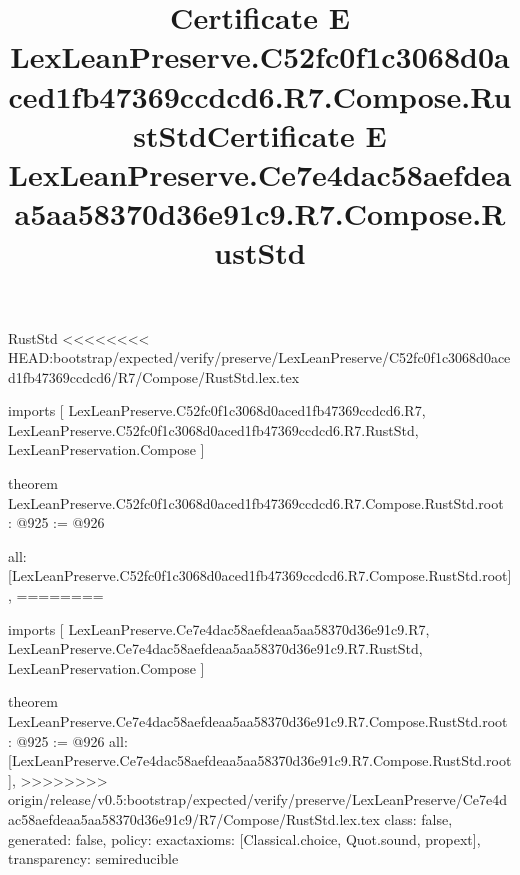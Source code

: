 \begin{lexlean}{RustStd}
<<<<<<<< HEAD:bootstrap/expected/verify/preserve/LexLeanPreserve/C52fc0f1c3068d0aced1fb47369ccdcd6/R7/Compose/RustStd.lex.tex
\title{Certificate E LexLeanPreserve.C52fc0f1c3068d0aced1fb47369ccdcd6.R7.Compose.RustStd}
\begin{coremodule}
imports [
  LexLeanPreserve.C52fc0f1c3068d0aced1fb47369ccdcd6.R7,
  LexLeanPreserve.C52fc0f1c3068d0aced1fb47369ccdcd6.R7.RustStd,
  LexLeanPreservation.Compose
]

theorem LexLeanPreserve.C52fc0f1c3068d0aced1fb47369ccdcd6.R7.Compose.RustStd.root : @925 := @926 {
  all: [LexLeanPreserve.C52fc0f1c3068d0aced1fb47369ccdcd6.R7.Compose.RustStd.root],
========
\title{Certificate E LexLeanPreserve.Ce7e4dac58aefdeaa5aa58370d36e91c9.R7.Compose.RustStd}
\begin{coremodule}
imports [
  LexLeanPreserve.Ce7e4dac58aefdeaa5aa58370d36e91c9.R7,
  LexLeanPreserve.Ce7e4dac58aefdeaa5aa58370d36e91c9.R7.RustStd,
  LexLeanPreservation.Compose
]

theorem LexLeanPreserve.Ce7e4dac58aefdeaa5aa58370d36e91c9.R7.Compose.RustStd.root : @925 := @926 {
  all: [LexLeanPreserve.Ce7e4dac58aefdeaa5aa58370d36e91c9.R7.Compose.RustStd.root],
>>>>>>>> origin/release/v0.5:bootstrap/expected/verify/preserve/LexLeanPreserve/Ce7e4dac58aefdeaa5aa58370d36e91c9/R7/Compose/RustStd.lex.tex
  class: false,
  generated: false,
  policy: exact{axioms: [Classical.choice, Quot.sound, propext]},
  transparency: semireducible
}


\end{coremodule}}
\end{coremodule}
\end{lexlean}

